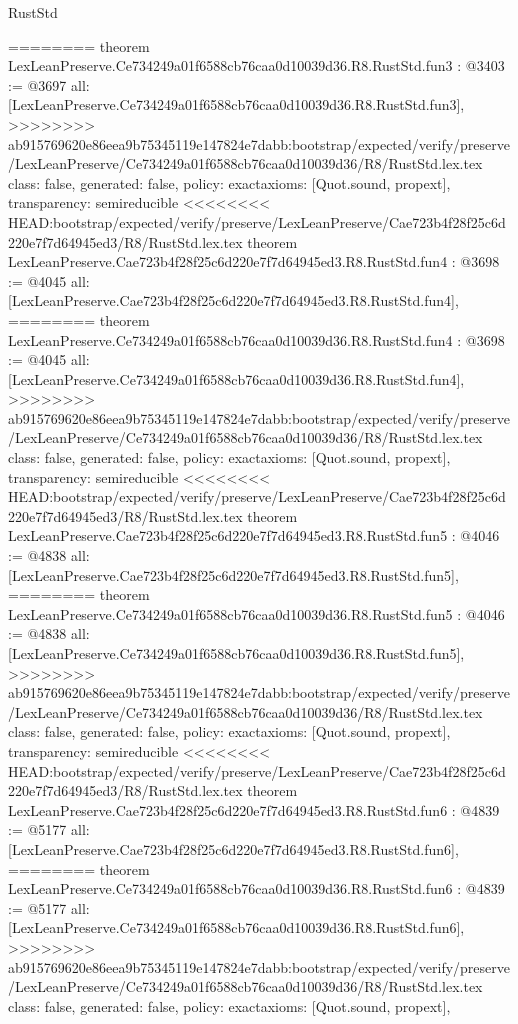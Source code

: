 \begin{lexlean}{RustStd}
\begin{coremodule}
{\begin{coremodule}
{{{{{{========
theorem LexLeanPreserve.Ce734249a01f6588cb76caa0d10039d36.R8.RustStd.fun3 : @3403 := @3697 {
  all: [LexLeanPreserve.Ce734249a01f6588cb76caa0d10039d36.R8.RustStd.fun3],
>>>>>>>> ab915769620e86eea9b75345119e147824e7dabb:bootstrap/expected/verify/preserve/LexLeanPreserve/Ce734249a01f6588cb76caa0d10039d36/R8/RustStd.lex.tex
  class: false,
  generated: false,
  policy: exact{axioms: [Quot.sound, propext]},
  transparency: semireducible
}
<<<<<<<< HEAD:bootstrap/expected/verify/preserve/LexLeanPreserve/Cae723b4f28f25c6d220e7f7d64945ed3/R8/RustStd.lex.tex
theorem LexLeanPreserve.Cae723b4f28f25c6d220e7f7d64945ed3.R8.RustStd.fun4 : @3698 := @4045 {
  all: [LexLeanPreserve.Cae723b4f28f25c6d220e7f7d64945ed3.R8.RustStd.fun4],
========
theorem LexLeanPreserve.Ce734249a01f6588cb76caa0d10039d36.R8.RustStd.fun4 : @3698 := @4045 {
  all: [LexLeanPreserve.Ce734249a01f6588cb76caa0d10039d36.R8.RustStd.fun4],
>>>>>>>> ab915769620e86eea9b75345119e147824e7dabb:bootstrap/expected/verify/preserve/LexLeanPreserve/Ce734249a01f6588cb76caa0d10039d36/R8/RustStd.lex.tex
  class: false,
  generated: false,
  policy: exact{axioms: [Quot.sound, propext]},
  transparency: semireducible
}
<<<<<<<< HEAD:bootstrap/expected/verify/preserve/LexLeanPreserve/Cae723b4f28f25c6d220e7f7d64945ed3/R8/RustStd.lex.tex
theorem LexLeanPreserve.Cae723b4f28f25c6d220e7f7d64945ed3.R8.RustStd.fun5 : @4046 := @4838 {
  all: [LexLeanPreserve.Cae723b4f28f25c6d220e7f7d64945ed3.R8.RustStd.fun5],
========
theorem LexLeanPreserve.Ce734249a01f6588cb76caa0d10039d36.R8.RustStd.fun5 : @4046 := @4838 {
  all: [LexLeanPreserve.Ce734249a01f6588cb76caa0d10039d36.R8.RustStd.fun5],
>>>>>>>> ab915769620e86eea9b75345119e147824e7dabb:bootstrap/expected/verify/preserve/LexLeanPreserve/Ce734249a01f6588cb76caa0d10039d36/R8/RustStd.lex.tex
  class: false,
  generated: false,
  policy: exact{axioms: [Quot.sound, propext]},
  transparency: semireducible
}
<<<<<<<< HEAD:bootstrap/expected/verify/preserve/LexLeanPreserve/Cae723b4f28f25c6d220e7f7d64945ed3/R8/RustStd.lex.tex
theorem LexLeanPreserve.Cae723b4f28f25c6d220e7f7d64945ed3.R8.RustStd.fun6 : @4839 := @5177 {
  all: [LexLeanPreserve.Cae723b4f28f25c6d220e7f7d64945ed3.R8.RustStd.fun6],
========
theorem LexLeanPreserve.Ce734249a01f6588cb76caa0d10039d36.R8.RustStd.fun6 : @4839 := @5177 {
  all: [LexLeanPreserve.Ce734249a01f6588cb76caa0d10039d36.R8.RustStd.fun6],
>>>>>>>> ab915769620e86eea9b75345119e147824e7dabb:bootstrap/expected/verify/preserve/LexLeanPreserve/Ce734249a01f6588cb76caa0d10039d36/R8/RustStd.lex.tex
  class: false,
  generated: false,
  policy: exact{axioms: [Quot.sound, propext]},
}}}}}}}}}}
\end{coremodule}}
\end{coremodule}
\end{lexlean}
